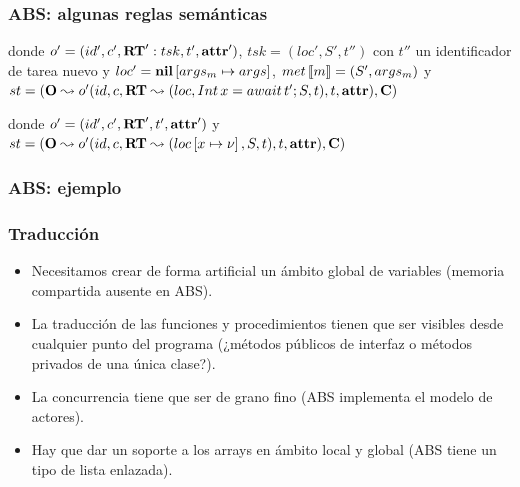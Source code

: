 \documentclass[spanish, a4paper, 12pt, final, slideColor, nototal, colorBG, pdf, noaccumulate, darkblue] {beamer}
\begin{document}
\begin{frame}[fragile]
  \frametitle{ABS: algunas reglas semánticas}
  \fontsize{5}{7.2}\selectfont
\begin{prooftree*}
\end{prooftree*}
 \fontsize{7}{7.2}\selectfont
 donde $o' = (id', c', \textbf{RT}':tsk, t', \textbf{attr}')$, $tsk = (loc', S', t'')$ con $t''$ un identificador de tarea nuevo y $loc' = \textbf{nil}\left[ args_m\mapsto args \right]$, $met\left\llbracket m \right\rrbracket = (S', args_m)$ y $st = (\mathbf{O} \leadsto o' (id, c, \textbf{RT} \leadsto (loc, Int\,x = await\,t'\mbox{;\,} S, t), t, \textbf{attr}), \mathbf{C})$

 \begin{prooftree*}
  \end{prooftree*} donde $o' = (id', c', \textbf{RT}', t', \textbf{attr}')$ y $st = (\mathbf{O} \leadsto o' (id, c, \textbf{RT} \leadsto (loc\left[ x\mapsto\nu \right], S, t), t, \textbf{attr}), \mathbf{C})$

 \fontsize{6}{7.2}\selectfont
 \begin{prooftree*}
  \end{prooftree*}
\end{frame}

\begin{frame}[fragile]
  \frametitle{ABS: ejemplo}
  \fontsize{5}{7.2}\selectfont
   \begin{multicols}{2}
     
   \end{multicols}
\end{frame}

\begin{frame}[fragile]
  \frametitle{Traducción}
  \begin{itemize}
  \item Necesitamos crear de forma artificial un ámbito global de variables (memoria compartida ausente en ABS).
  \item La traducción de las funciones y procedimientos tienen que ser visibles desde cualquier punto del programa (¿métodos públicos de interfaz o métodos privados de una única clase?).
  \item La concurrencia tiene que ser de grano fino (ABS implementa el modelo de actores).
  \item Hay que dar un soporte a los arrays en ámbito local y global (ABS tiene un tipo de lista enlazada).
  \end{itemize}
\end{frame}
\end{document}
